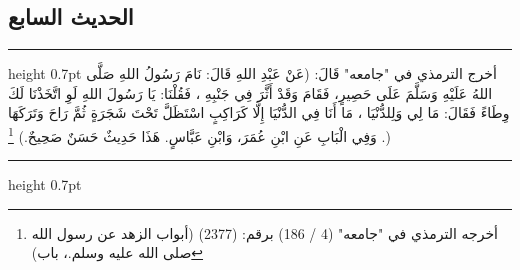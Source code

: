 \documentclass[12pt,openany]{book}
\newenvironment{hadithblock}
  {\par\medskip\noindent\begin{minipage}{\linewidth}\hrule height 0.7pt \vspace{0.6em}\small}
  {\vspace{0.4em}\hrule height 0.7pt\end{minipage}\par\medskip}
\begin{document}
\subsection*{الحديث السابع}
\begin{hadithblock}
أخرج الترمذي في "جامعه" قَالَ: (عَنْ عَبْدِ اللهِ قَالَ: نَامَ رَسُولُ اللهِ صَلَّى اللهُ عَلَيْهِ وَسَلَّمَ عَلَى حَصِيرٍ، فَقَامَ وَقَدْ أَثَّرَ فِي جَنْبِهِ ، فَقُلْنَا: يَا رَسُولَ اللهِ لَوِ اتَّخَذْنَا لَكَ وِطَاءً فَقَالَ: مَا لِي وَلِلدُّنْيَا ، مَا أَنَا فِي الدُّنْيَا إِلَّا كَرَاكِبٍ اسْتَظَلَّ تَحْتَ شَجَرَةٍ ثُمَّ رَاحَ وَتَرَكَهَا . وَفِي الْبَابِ عَنِ ابْنِ عُمَرَ، وَابْنِ عَبَّاسٍ. هَذَا حَدِيثٌ حَسَنٌ صَحِيحٌ.) \footnote{أخرجه الترمذي في "جامعه" (4 / 186) برقم: (2377) (أبواب الزهد عن رسول الله صلى الله عليه وسلم.، باب)})
\end{hadithblock}
\end{document}
